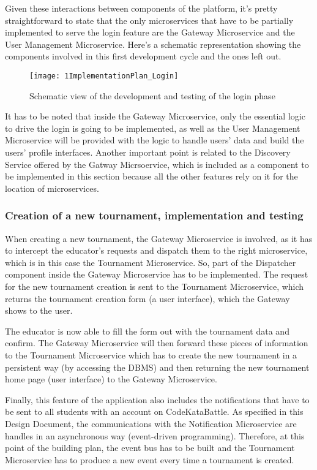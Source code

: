 Given these interactions between components of the \app platform, it's pretty straightforward to state that the only microservices that have to be partially implemented to serve the login feature are the Gateway Microservice and the User Management Microservice. 
Here's a schematic representation showing the components involved in this first development cycle and the ones left out.

\begin{figure}[h]
        \centering
	\texttt{[image: 1ImplementationPlan\_Login]}
        \caption{Schematic view of the development and testing of the login phase}
\end{figure}


It has to be noted that inside the Gateway Microservice, only the essential logic to drive the login is going to be implemented, as well as the User Management Microservice will be provided with the logic to handle users' data and build the users' profile interfaces.
Another important point is related to the Discovery Service offered by the Gatway Micrsoervice, which is included as a component to be implemented in this section because all the other features rely on it for the location of microservices.
\newpage


\subsubsection*{Creation of a new tournament, implementation and testing}

When creating a new tournament, the Gateway Microservice is involved, as it has to intercept the educator's requests and dispatch them to the right microservice, which is in this case the Tournament Microservice. So, part of the Dispatcher component inside the Gateway Microservice has to be implemented. 
The request for the new tournament creation is sent to the Tournament Microservice, which returns the tournament creation form (a user interface), which the Gateway shows to the user.

The educator is now able to fill the form out with the tournament data and confirm. The Gateway Microservice will then forward these pieces of information to the Tournament Microservice which has to create the new tournament in a persistent way (by accessing the DBMS) and then returning the new tournament home page (user interface) to the Gateway Microservice.

Finally, this feature of the application also includes the notifications that have to be sent to all students with an account on CodeKataBattle. As specified in this Design Document, the communications with the Notification Microservice  are handles in an asynchronous way (event-driven programming). Therefore, at this point of the building plan, the event bus has to be built and the Tournament Microservice has to produce a new event every time a tournament is created. 

